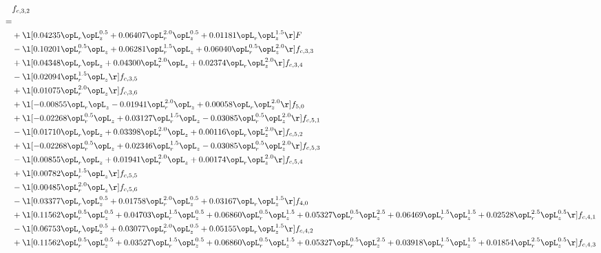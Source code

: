 \begin{alignat}{2} 
\label{eq:f_32_2} 
& f_{c,3,2} \nonumber \\ 
 = \\ 
& + \l[  0.04235 \opL_r \opL_z^{0.5} +  0.06407 \opL_r^{2.0} \opL_z^{0.5} +  0.01181 \opL_r \opL_z^{1.5}  \r] F \nonumber \\ 
& - \l[  0.10201 \opL_r^{0.5} \opL_z +  0.06281 \opL_r^{1.5} \opL_z +  0.06040 \opL_r^{0.5} \opL_z^{2.0}  \r] f_{c,3,3} \nonumber \\ 
& + \l[  0.04348 \opL_r \opL_z +  0.04300 \opL_r^{2.0} \opL_z +  0.02374 \opL_r \opL_z^{2.0}  \r] f_{c,3,4} \nonumber \\ 
& - \l[  0.02094 \opL_r^{1.5} \opL_z  \r] f_{c,3,5} \nonumber \\ 
& + \l[  0.01075 \opL_r^{2.0} \opL_z  \r] f_{c,3,6} \nonumber \\ 
& + \l[  -0.00855 \opL_r \opL_z   -0.01941 \opL_r^{2.0} \opL_z +  0.00058 \opL_r \opL_z^{2.0}  \r] f_{5,0} \nonumber \\ 
& + \l[  -0.02268 \opL_r^{0.5} \opL_z +  0.03127 \opL_r^{1.5} \opL_z   -0.03085 \opL_r^{0.5} \opL_z^{2.0}  \r] f_{c,5,1} \nonumber \\ 
& - \l[  0.01710 \opL_r \opL_z +  0.03398 \opL_r^{2.0} \opL_z +  0.00116 \opL_r \opL_z^{2.0}  \r] f_{c,5,2} \nonumber \\ 
& + \l[  -0.02268 \opL_r^{0.5} \opL_z +  0.02346 \opL_r^{1.5} \opL_z   -0.03085 \opL_r^{0.5} \opL_z^{2.0}  \r] f_{c,5,3} \nonumber \\ 
& - \l[  0.00855 \opL_r \opL_z +  0.01941 \opL_r^{2.0} \opL_z +  0.00174 \opL_r \opL_z^{2.0}  \r] f_{c,5,4} \nonumber \\ 
& + \l[  0.00782 \opL_r^{1.5} \opL_z  \r] f_{c,5,5} \nonumber \\ 
& - \l[  0.00485 \opL_r^{2.0} \opL_z  \r] f_{c,5,6} \nonumber \\ 
& - \l[  0.03377 \opL_r \opL_z^{0.5} +  0.01758 \opL_r^{2.0} \opL_z^{0.5} +  0.03167 \opL_r \opL_z^{1.5}  \r] f_{4,0} \nonumber \\ 
& + \l[  0.11562 \opL_r^{0.5} \opL_z^{0.5} +  0.04703 \opL_r^{1.5} \opL_z^{0.5} +  0.06860 \opL_r^{0.5} \opL_z^{1.5} +  0.05327 \opL_r^{0.5} \opL_z^{2.5} +  0.06469 \opL_r^{1.5} \opL_z^{1.5} +  0.02528 \opL_r^{2.5} \opL_z^{0.5}  \r] f_{c,4,1} \nonumber \\ 
& - \l[  0.06753 \opL_r \opL_z^{0.5} +  0.03077 \opL_r^{2.0} \opL_z^{0.5} +  0.05155 \opL_r \opL_z^{1.5}  \r] f_{c,4,2} \nonumber \\ 
& + \l[  0.11562 \opL_r^{0.5} \opL_z^{0.5} +  0.03527 \opL_r^{1.5} \opL_z^{0.5} +  0.06860 \opL_r^{0.5} \opL_z^{1.5} +  0.05327 \opL_r^{0.5} \opL_z^{2.5} +  0.03918 \opL_r^{1.5} \opL_z^{1.5} +  0.01854 \opL_r^{2.5} \opL_z^{0.5}  \r] f_{c,4,3} \nonumber \\ 

\end{alignat}
